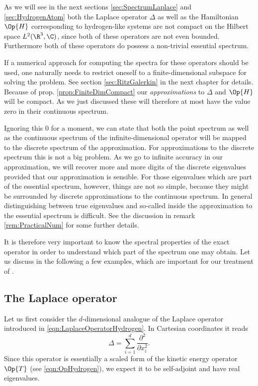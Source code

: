 \begin{rem}
	\label{rem:NumericalEssentialSpectrum}
As we will see in the next sections \vref{sec:SpectrumLaplace}
and \vref{sec:HydrogenAtom} both the Laplace operator $\Delta$ as well as the
Hamiltonian $\Op{H}$ corresponding to hydrogen-like systems
are not compact on the Hilbert space $L^2(\R^3, \C)$,
since both of these operators are not even bounded.
Furthermore both of these operators do possess a non-trivial essential spectrum.

If a numerical approach for computing the spectra for these operators
should be used,
one naturally needs to restrict oneself to a finite-dimensional subspace
for solving the problem.
See section \vref{sec:RitzGalerkin} in the next chapter for details.
Because of prop. \vref{prop:FiniteDimCompact} our \emph{approximations}
to $\Delta$ and $\Op{H}$ will be compact.
As we just discussed these will therefore
at most have the value zero in their continuous spectrum.

Ignoring this $0$ for a moment,
we can state that
both the point spectrum as well as the continuous spectrum
of the infinite-dimensional operator will be mapped to the discrete
spectrum of the approximation.
For approximations to the discrete spectrum this is not a big problem.
As we go to infinite accuracy in our approximation,
we will recover more and more digits of the discrete eigenvalues
provided that our approximation is sensible.
For those eigenvalues which are part of the essential spectrum, however,
things are not so simple, because they might be surrounded by
discrete approximations to the continuous spectrum.
In general distinguishing between true eigenvalues
and so-called  inside the approximation
to the essential spectrum is difficult.
See the discussion in remark \vref{rem:PracticalNum} for some
further details.
\end{rem}

It is therefore very important to know
the spectral properties of the exact operator
in order to understand which part of the spectrum one may obtain.
Let us discuss in the following a few examples,
which are important for our treatment of \QM.

\subsection{The Laplace operator}
\label{sec:SpectrumLaplace}
Let us first consider the $d$-dimensional analogue of the Laplace operator
introduced in \eqref{eqn:LaplaceOperatorHydrogen}.
In Cartesian coordinates it reads
\begin{equation}
	\Delta = \sum_{i=1}^d \frac{\partial^2}{\partial x_i^2}.
	\label{eqn:LaplaceOperatorD}
\end{equation}
Since this operator is essentially a scaled form of the kinetic energy operator $\Op{T}$
(see \eqref{eqn:OpHydrogen}),
we expect it to be self-adjoint and have real eigenvalues.

